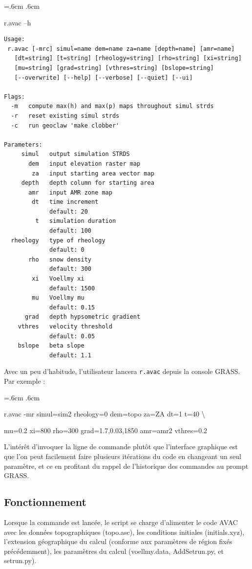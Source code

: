\documentclass[12pt,oneside]{paper}
\newenvironment{code}{%
\vspace{2mm}%
\hangindent=.6cm%
\parindent.6cm%
\ttfamily%
\color{gris.3}%
}{
\vspace{2mm}%
}
\begin{document}
\begin{code}
r.avac --h
\begin{Verbatim}
Usage:
 r.avac [-mrc] simul=name dem=name za=name [depth=name] [amr=name]
   [dt=string] [t=string] [rheology=string] [rho=string] [xi=string]
   [mu=string] [grad=string] [vthres=string] [bslope=string]
   [--overwrite] [--help] [--verbose] [--quiet] [--ui]

Flags:
  -m   compute max(h) and max(p) maps throughout simul strds
  -r   reset existing simul strds
  -c   run geoclaw 'make clobber'

Parameters:
     simul   output simulation STRDS
       dem   input elevation raster map
        za   input starting area vector map
     depth   depth column for starting area
       amr   input AMR zone map
        dt   time increment
             default: 20
         t   simulation duration
             default: 100
  rheology   type of rheology
             default: 0
       rho   snow density
             default: 300
        xi   Voellmy xi
             default: 1500
        mu   Voellmy mu
             default: 0.15
      grad   depth hypsometric gradient
    vthres   velocity threshold
             default: 0.05
    bslope   beta slope
             default: 1.1
\end{Verbatim}
\end{code}

Avec un peu d'habitude, l'utilisateur lancera \verb+r.avac+ depuis la console GRASS. Par exemple :

\begin{code}
r.avac -mr simul=sim2 rheology=0 dem=topo za=ZA dt=1 t=40 \backslash 

mu=0.2 xi=800 rho=300 grad=1.7,0.03,1850 amr=amr2 vthres=0.2
\end{code}

L'intérêt d'invoquer la ligne de commande plutôt que l'interface graphique est que l'on peut facilement faire plusieurs itérations du code en changeant un seul paramètre, et ce en profitant du rappel de l'historique des commandes au prompt GRASS.

\subsection{Fonctionnement}

Lorsque la commande est lancée, le script se charge d'alimenter le code AVAC avec les données topographiques (topo.asc), les conditions initiales (initials.xyz), l'extension géographique du calcul (conforme aux paramètres de région fixés précédemment), les paramètres du calcul (voellmy.data, AddSetrun.py, et setrun.py).
\end{document}

